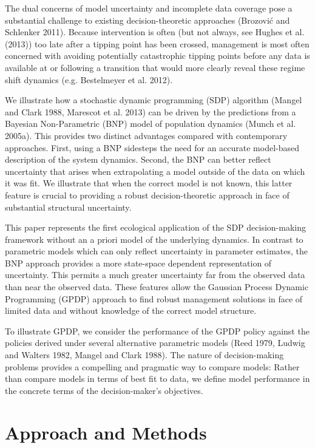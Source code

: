 \documentclass[]{components/elsarticle}
\begin{document}
The dual concerns of model uncertainty and incomplete data coverage pose
a substantial challenge to existing decision-theoretic approaches
(Brozović and Schlenker 2011). Because intervention is often (but not
always, see Hughes et al. (2013)) too late after a tipping point has
been crossed, management is most often concerned with avoiding
potentially catastrophic tipping points before any data is available at
or following a transition that would more clearly reveal these regime
shift dynamics (e.g. Bestelmeyer et al. 2012).

We illustrate how a stochastic dynamic programming (SDP) algorithm
(Mangel and Clark 1988, Marescot et al. 2013) can be driven by the
predictions from a Bayesian Non-Parametric (BNP) model of population
dynamics (Munch et al. 2005a). This provides two distinct advantages
compared with contemporary approaches. First, using a BNP sidesteps the
need for an accurate model-based description of the system dynamics.
Second, the BNP can better reflect uncertainty that arises when
extrapolating a model outside of the data on which it was fit. We
illustrate that when the correct model is not known, this latter feature
is crucial to providing a robust decision-theoretic approach in face of
substantial structural uncertainty.

This paper represents the first ecological application of the SDP
decision-making framework without an a priori model of the underlying
dynamics. In contrast to parametric models which can only reflect
uncertainty in parameter estimates, the BNP approach provides a more
state-space dependent representation of uncertainty. This permits a much
greater uncertainty far from the observed data than near the observed
data. These features allow the Gaussian Process Dynamic Programming
(GPDP) approach to find robust management solutions in face of limited
data and without knowledge of the correct model structure.

To illustrate GPDP, we consider the performance of the GPDP policy
against the policies derived under several alternative parametric models
(Reed 1979, Ludwig and Walters 1982, Mangel and Clark 1988). The nature
of decision-making problems provides a compelling and pragmatic way to
compare models: Rather than compare models in terms of best fit to data,
we define model performance in the concrete terms of the
decision-maker's objectives.

\section{Approach and Methods}\label{approach-and-methods}
\end{document}
